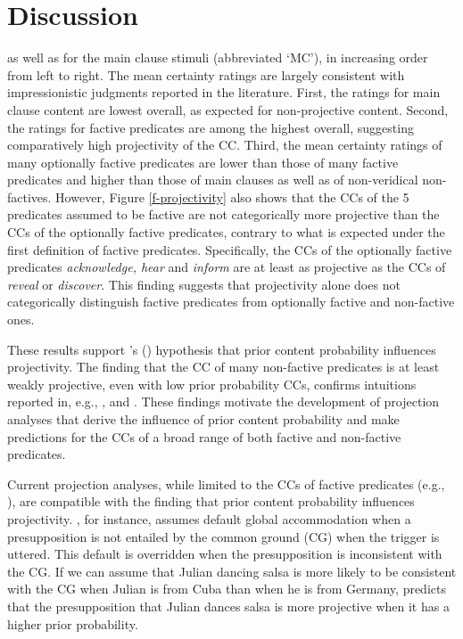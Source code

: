 \documentclass[11pt,fleqn]{article}
\newcommand{\6}{\mbox{$[\hspace*{-.6mm}[$}}
\newcommand{\9}{\mbox{$]\hspace*{-.6mm}]$}}
\newcommand{\citetpos}[1]{\citeauthor{#1}'s (\citeyear{#1})}
\begin{document}
\section{Discussion}\label{s4}


as well as for the main clause stimuli (abbreviated `MC'), in increasing order from left to right. The mean certainty ratings are largely consistent with impressionistic judgments reported in the literature. First, the ratings for main clause content are lowest overall, as expected for non-projective content. Second, the ratings for factive predicates are among the highest overall, suggesting comparatively high projectivity of the CC. Third, the mean certainty ratings of many optionally factive predicates are lower than those of many factive predicates and higher than those of main clauses as well as of non-veridical non-factives. However, Figure \ref{f-projectivity} also shows that the CCs of the 5 predicates assumed to be factive are not categorically more projective than the CCs of the optionally factive predicates, contrary to what is expected under the first definition of factive predicates. Specifically, the CCs of the optionally factive predicates {\em acknowledge, hear} and {\em inform} are at least as projective as the CCs of {\em reveal} or {\em discover}. This finding suggests that projectivity alone does not categorically distinguish factive predicates from optionally factive and non-factive ones.


These results support \citetpos{tbd-variability} hypothesis that prior content probability influences projectivity. The finding that the CC of many non-factive predicates is at least weakly projective, even with low prior probability CCs, confirms intuitions reported in, e.g., \citealt{schlenker10}, \citealt{anand-hacquard2014} and \citealt{spector-egre2015}. These findings motivate the development of projection analyses that derive the influence of prior content probability and make predictions for the CCs of a broad range of both factive and non-factive predicates.

Current projection analyses, while limited to the CCs of factive predicates (e.g., \citealt{heim83,vds92,abrusan2011,brst-salt10,brst-ar}), are compatible with the finding that prior content probability influences projectivity. \citealt{heim83}, for instance, assumes default global accommodation when a presupposition is not entailed by the common ground (CG) when the trigger is uttered. This default is overridden when the presupposition is inconsistent with the CG. If we can assume that Julian dancing salsa is more likely to be consistent with the CG when Julian is from Cuba than when he is from Germany, \citealt{heim83} predicts that the presupposition that Julian dances salsa is more projective when it has a higher prior probability. 
\end{document}
